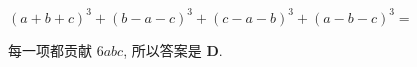 \begin{prob}
\label{prob:prob-9}
$(a+b+c)^3 + (b-a-c)^3 + (c-a-b)^3 + (a-b-c)^3 = $
\end{prob}

\begin{soln}
每一项都贡献 $6abc$, 所以答案是 $\boxed{\textbf{D}.}$
\end{soln}
